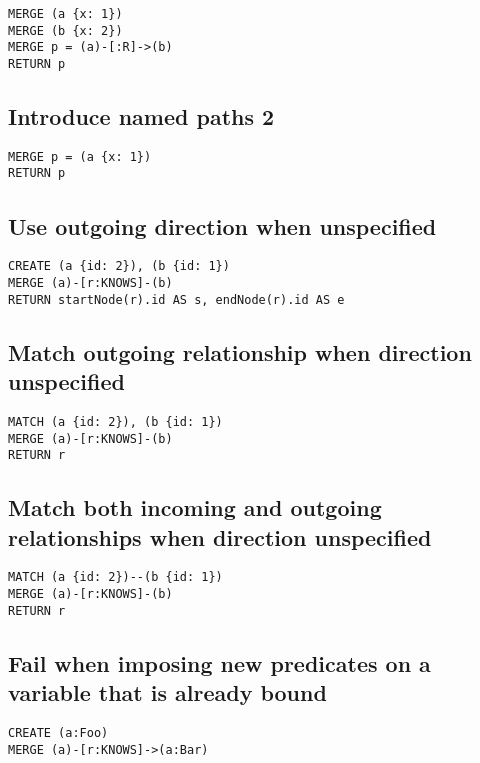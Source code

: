 \begin{lstlisting}
MERGE (a {x: 1})
MERGE (b {x: 2})
MERGE p = (a)-[:R]->(b)
RETURN p
\end{lstlisting}

\subsection{Introduce named paths 2}

\begin{lstlisting}
MERGE p = (a {x: 1})
RETURN p
\end{lstlisting}

\subsection{Use outgoing direction when unspecified}

\begin{lstlisting}
CREATE (a {id: 2}), (b {id: 1})
MERGE (a)-[r:KNOWS]-(b)
RETURN startNode(r).id AS s, endNode(r).id AS e
\end{lstlisting}

\subsection{Match outgoing relationship when direction unspecified}

\begin{lstlisting}
MATCH (a {id: 2}), (b {id: 1})
MERGE (a)-[r:KNOWS]-(b)
RETURN r
\end{lstlisting}

\subsection{Match both incoming and outgoing relationships when direction unspecified}

\begin{lstlisting}
MATCH (a {id: 2})--(b {id: 1})
MERGE (a)-[r:KNOWS]-(b)
RETURN r
\end{lstlisting}

\subsection{Fail when imposing new predicates on a variable that is already bound}

\begin{lstlisting}
CREATE (a:Foo)
MERGE (a)-[r:KNOWS]->(a:Bar)
\end{lstlisting}


